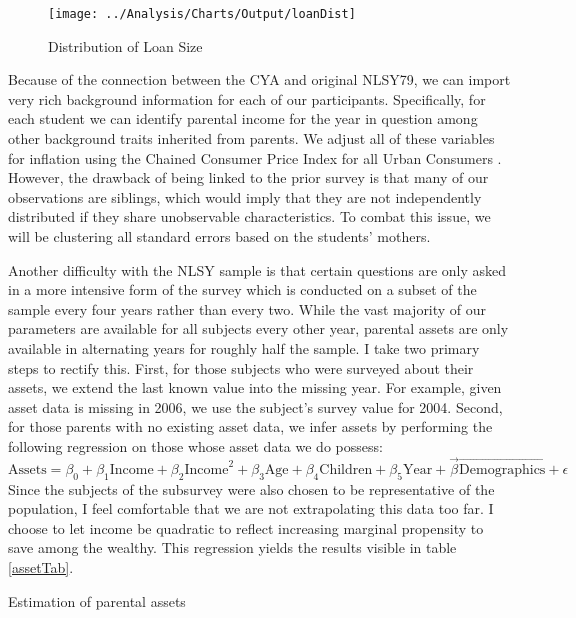 \documentclass{article}
\begin{document}
	\begin{figure}
		\centering
		\caption{Distribution of Loan Size}
		\label{loanDist}
		\texttt{[image: ../Analysis/Charts/Output/loanDist]}
	\end{figure}

	
	Because of the connection between the CYA and original NLSY79, we can import very rich background information for each of our participants. Specifically, for each student we can identify parental income for the year in question among other background traits inherited from parents. We adjust all of these variables for inflation using the Chained Consumer Price Index for all Urban Consumers \parencite{bls2019}. However, the drawback of being linked to the prior survey is that many of our observations are siblings, which would imply that they are not independently distributed if they share unobservable characteristics. To combat this issue, we will be clustering all standard errors based on the students' mothers. 
	
	Another difficulty with the NLSY sample is that certain questions are only asked in a more intensive form of the survey which is conducted on a subset of the sample every four years rather than every two. While the vast majority of our parameters are available for all subjects every other year, parental assets are only available in alternating years for roughly half the sample. I take two primary steps to rectify this. First, for those subjects who were surveyed about their assets, we extend the last known value into the missing year. For example, given asset data is missing in 2006, we use the subject's survey value for 2004. Second, for those parents with no existing asset data, we infer assets by performing the following regression on those whose asset data we do possess: $$\mbox{Assets} = \beta_0 + \beta_1 \mbox{Income} + \beta_2 \mbox{Income}^2 + \beta_3 \mbox{Age} + \beta_4 \mbox{Children} + \beta_5 \mbox{Year} + \vec{\beta} \vec{\mbox{Demographics}} + \epsilon$$ Since the subjects of the subsurvey were also chosen to be representative of the population, I feel comfortable that we are not extrapolating this data too far. I choose to let income be quadratic to reflect increasing marginal propensity to save among the wealthy. This regression yields the results visible in table \ref{assetTab}.
	
	\begin{table}
		\centering
		\caption{Estimation of parental assets}
		
		\label{assetTab}
	\end{table}
\end{document}
